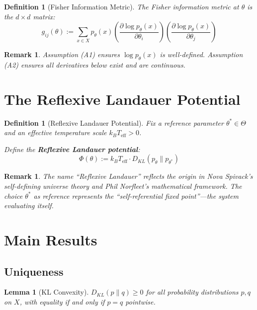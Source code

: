 \documentclass[11pt]{article}
\newtheorem{lemma}[theorem]{Lemma}
\newtheorem{definition}[theorem]{Definition}
\newtheorem{remark}[theorem]{Remark}
\begin{document}
\begin{definition}[Fisher Information Metric]
The Fisher information metric at $\theta$ is the $d \times d$ matrix:
\begin{equation}
g_{ij}(\theta) := \sum_{x \in X} p_\theta(x) \left( \frac{\partial \log p_\theta(x)}{\partial \theta_i} \right) \left( \frac{\partial \log p_\theta(x)}{\partial \theta_j} \right)
\end{equation}
\end{definition}

\begin{remark}
Assumption (A1) ensures $\log p_\theta(x)$ is well-defined. Assumption (A2) ensures all derivatives below exist and are continuous.
\end{remark}

\section{The Reflexive Landauer Potential}

\begin{definition}[Reflexive Landauer Potential]
Fix a reference parameter $\theta^* \in \Theta$ and an effective temperature scale $k_B T_{\text{eff}} > 0$.

Define the \textbf{Reflexive Landauer potential}:
\begin{equation}
\Phi(\theta) := k_B T_{\text{eff}} \cdot D_{KL}(p_\theta \| p_{\theta^*})
\end{equation}
\end{definition}

\begin{remark}
The name ``Reflexive Landauer'' reflects the origin in Nova Spivack's self-defining universe theory and Phil Norfleet's mathematical framework. The choice $\theta^*$ as reference represents the ``self-referential fixed point''---the system evaluating itself.
\end{remark}

\section{Main Results}

\subsection{Uniqueness}

\begin{lemma}[KL Convexity]
\label{lem:kl_convex}
$D_{KL}(p \| q) \geq 0$ for all probability distributions $p, q$ on $X$, with equality if and only if $p = q$ pointwise.
\end{lemma}
\end{document}
